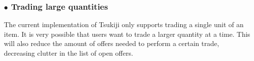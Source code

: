 \subsubsection*{$\bullet$ Trading large quantities}
The current implementation of Tsukiji only supports trading a single unit of an item.
It is very possible that users want to trade a larger quantity at a time.
This will also reduce the amount of offers needed to perform a certain trade, decreasing clutter in the list of open offers.